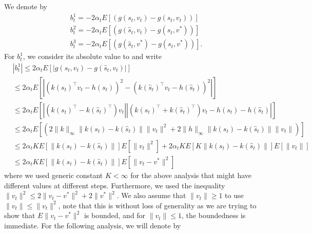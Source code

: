 \documentclass[twoside,11pt]{article}
\begin{document}
 We denote by 
\begin{align*}
&b^1_t =  -2\alpha_t E\left[   \left(g(s_t,v_t) - g(\hat{s}_t,v_t)\right)\right] \\
&b_t^2 = -2\alpha_t   E\left[   \left(g(\hat{s}_t,v_t) - g(\hat{s}_t,v^*)\right)\right] \nonumber \\
&b_t^3 = -2\alpha_t   E\left[  \left(g(\hat{s}_t,v^*) - g(s_t,v^*)\right)\right] .
\end{align*}
For $b_t^1$, we consider its absolute value to and write
\begin{align}\label{b_1}
&|b_t^1| \leq 2\alpha_t E\left[   \left|g(s_t,v_t) - g(\hat{s}_t,v_t)\right|\right] \nonumber\\
&\leq 2\alpha_t E\left[  \left| (k(s_t)^\intercal v_t  -h(s_t) )^2 -    (k(\hat{s}_t)^\intercal v_t  -h(\hat{s}_t) )^2  \right|\right] \nonumber\\
&\leq  2\alpha_t E\left[    \left| \left(k(s_t)^\intercal - k(\hat{s}_t)^\intercal \right) v_t\right| \left| \left(k(s_t)^\intercal + k(\hat{s}_t)^\intercal \right)v_t - h(s_t) - h(\hat{s}_t)  \right|    \right]\nonumber\\
& \leq 2\alpha_tE\left[  \left( 2\|k\|_\infty \| k(s_t) - k(\hat{s}_t)\| \|v_t\|^2 +   2\|h\|_\infty \| k(s_t) - k(\hat{s}_t)\| \|v_t\|  \right)  \right]\nonumber\\
& \leq  2\alpha_t  K E\left[  \|k(s_t) - k(\hat{s}_t)\| \right] E \left[  \|v_t\|^2 \right] +   2\alpha_t  K E\left[ K \|k(s_t) - k(\hat{s}_t)\| \right] E \left[  \|v_t\| \right]  \nonumber\\
&\leq 2\alpha_t K E\left[  \|k(s_t) - k(\hat{s}_t)\| \right] E \left[  \|v_t -v^*\|^2 \right] %
\end{align}
where we used generic constant $K<\infty$ for the above analysis that might have different values at different steps. Furthermore, we used the inequality $\|v_t\|^2 \leq 2 \|v_t-v^*\|^2 + 2\|v^*\|^2$.   We also assume that $\|v_t\| \geq 1$ to use $\|v_t\| \leq \|v_t\|^2$, note that this is without loss of generality as we are trying to show that $E\|v_t-v^*\|^2$ is bounded, and for $\|v_t\| \leq 1$, the boundedness is immediate.   For the following analysis, we will denote by
\end{document}
